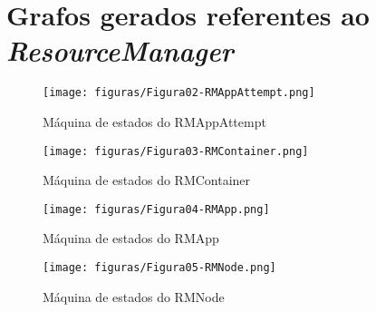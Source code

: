 
\chapter{Grafos gerados referentes ao \emph{ResourceManager}}


\begin{figure}[hbtn]
   \centering
   \texttt{[image: figuras/Figura02-RMAppAttempt.png]}
   \caption{Máquina de estados do RMAppAttempt}
   \label{fig:RMAppAttempt}
\end{figure}

\begin{figure}[hbtn]
   \centering
   \texttt{[image: figuras/Figura03-RMContainer.png]}
   \caption{Máquina de estados do RMContainer}
   \label{fig:RMContainer}
\end{figure}

\begin{figure}[hbtn]
   \centering
   \texttt{[image: figuras/Figura04-RMApp.png]}
   \caption{Máquina de estados do RMApp}
   \label{fig:RMApp}
\end{figure}

\begin{figure}[hbtn]
   \centering
   \texttt{[image: figuras/Figura05-RMNode.png]}
   \caption{Máquina de estados do RMNode}
   \label{fig:RMNode}
\end{figure}

